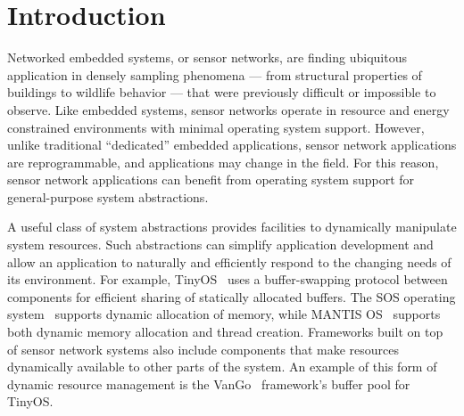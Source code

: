 \section{Introduction}
\label{sec:intro}

% 
% 
% 
% 


Networked embedded systems, or sensor networks, are finding ubiquitous
application in densely sampling phenomena --- from structural properties of
buildings to wildlife behavior --- that were previously difficult or
impossible to observe.  
%
Like embedded systems, sensor networks operate in resource and energy
constrained environments with minimal operating system support.  
%
However, unlike traditional ``dedicated'' embedded applications, sensor
network applications are reprogrammable, and applications may change in the
field.  
%
For this reason, sensor network applications can benefit from operating
system support for general-purpose system abstractions.



A useful class of system abstractions provides facilities to dynamically
manipulate system resources.  
%
Such abstractions can simplify application development and allow an
application to naturally and efficiently respond to the changing needs of
its environment.  
%
For example, TinyOS~\cite{TinyOS} uses a buffer-swapping protocol between
components for efficient sharing of statically allocated buffers.  
%
The SOS operating system~\cite{sos} supports dynamic allocation of memory,
while MANTIS OS~\cite{abrach03mantis} supports both dynamic memory
allocation and thread creation.  
%
Frameworks built on top of sensor network systems also include components
that make resources dynamically available to other parts of the system.  
%
An example of this form of dynamic resource management is the
VanGo~\cite{greenstein05vango} framework's buffer pool for TinyOS. 



